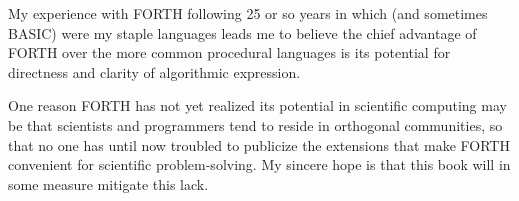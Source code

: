 My experience with FORTH following 25 or so years in which (and sometimes BASIC) were my staple languages leads me to believe the chief advantage of FORTH over the more common procedural languages is its potential for directness and clarity of algorithmic expression.
 
One reason FORTH has not yet realized its potential in scientific computing may be that scientists and programmers tend to reside in orthogonal communities, so that no one has until now troubled to publicize the extensions that make FORTH convenient for scientific problem-solving. My sincere hope is that this book will in some measure mitigate this lack.